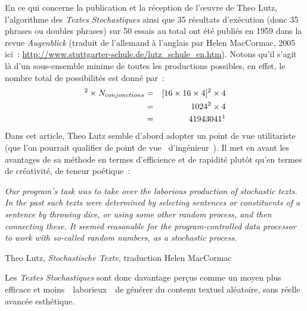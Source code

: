 \documentclass{article}
\newenvironment{citationbox}
{\begin{center}
		\begin{minipage}{.8\textwidth}
		}
		{
		\end{minipage}	
\end{center}
}
\begin{document}
				En ce qui concerne la publication et la réception de l'œuvre de Theo Lutz, l'algorithme des \textit{Textes Stochastiques} ainsi que 35 résultats d'exécution (donc 35 phrases ou doubles phrases) sur 50 essais au total ont été publiés en 1959 dans la revue \autocite{lutz1959} \textit{Augenblick} (traduit de l'allemand à l'anglais par Helen MacCormac, 2005 ici : \href{http://www.stuttgarter-schule.de/lutz_schule_en.htm}{http://www.stuttgarter-schule.de/lutz\_schule\_en.htm}). Notons qu'il s'agit là d'un sous-ensemble minime de toutes les productions possibles, en effet, le nombre total de possibilités est donné par : 
				\begin{eqnarray*}
					[N_{Noms} \times N_{adjectifs} \times N_{Phrases}]^2 \times N_{conjonctions} &=& [16 \times 16 \times 4]^2 \times 4\\
					&=& 1024^2 \times 4\\
					&=& 41943041 \footnotemark \\
				\end{eqnarray*}	
				Dans cet article, Theo Lutz semble d'abord adopter un point de vue utilitariste (que  l'on pourrait qualifier de point de vue \guillemotleft~d'ingénieur~\guillemotright). Il met en avant les avantages de sa méthode en termes d'efficience et de rapidité plutôt qu'en termes de créativité, de teneur poétique :
				\begin{citationbox}
					\textit{Our program's task was to take over the laborious production of stochastic texts. In the past such texts were determined by selecting sentences or constituents of a sentence by throwing dice, or using some other random process, and then connecting these. It seemed reasonable for the program-controlled data processor to work with so-called random numbers, as a stochastic process.}
					\begin{flushright}
						Theo Lutz, \textit{Stochastische Texte}, traduction Helen MacCormac \autocite{lutz1959}
					\end{flushright}
				\end{citationbox}
				Les \textit{Textes Stochastiques} sont donc davantage perçus comme un moyen plus efficace et moins \guillemotleft~laborieux~\guillemotright~de générer du contenu textuel aléatoire, sans réelle avancée esthétique.\\
				
\end{document}
